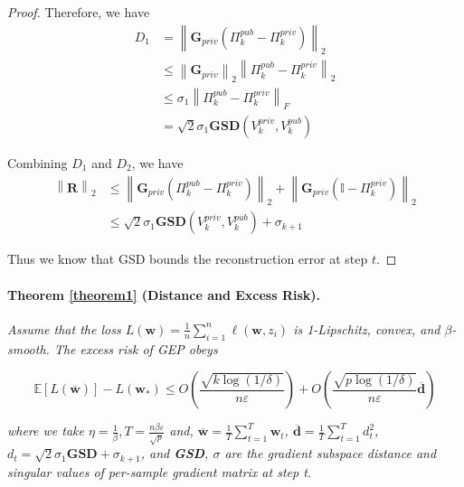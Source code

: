 \documentclass[11pt]{article}
\renewcommand{\epsilon}{\varepsilon}
\begin{document}
\begin{proof}
Therefore, we have
\begin{equation}
\begin{aligned}
    D_1 & = \left\| \mathbf{G}_{p r i v} (\Pi_k^{pub} - \Pi_k^{priv}) \right\|_2 \\
    & \le \left\| \mathbf{G}_{p r i v} \right\|_2 \left\| \Pi_k^{pub} - \Pi_k^{priv} \right\|_2 \\
    & \le \sigma_{1} \left\| \Pi_k^{pub} - \Pi_k^{priv} \right\|_F \\
    & = \sqrt{2}\sigma_{1} \mathbf{GSD}(V_k^{priv}, V_k^{p u b})
\end{aligned}
\end{equation}

Combining $D_1$ and $D_2$, we have
\begin{equation}
\begin{aligned}
\left\| \mathbf{R} \right\|_2 & \le \left\| \mathbf{G}_{p r i v} (\Pi_k^{pub} - \Pi_k^{priv}) \right\|_2 + \left\| \mathbf{G}_{p r i v}\left(\mathbb{I} - \Pi_k^{priv}\right)\right\|_2 \\
& \le \sqrt{2}\sigma_{1} \mathbf{GSD}(V_k^{priv}, V_k^{p u b}) + \sigma_{k + 1}
\end{aligned}
\end{equation}

Thus we know that GSD bounds the reconstruction error at step $t$.
\end{proof}

\paragraph{Theorem \ref{theorem1} (Distance and Excess Risk).} \textit{Assume that the loss $L(\mathbf{w}) = \frac{1}{n} \sum_{i=1}^n \ell\left(\mathbf{w}, z_i\right)$ is 1-Lipschitz, convex, and $\beta$-smooth. The excess risk of GEP \cite{donot} obeys}

\begin{equation}
    \mathbb{E}[L(\overline{\boldsymbol{\mathbf{w}}})]-L\left(\boldsymbol{\mathbf{w}}_*\right) \le O\left(\frac{\sqrt{k\log(1/\delta)}}{n\epsilon}\right) + O\left(\frac{\sqrt{p\log(1/\delta)}}{n\epsilon}\overline{\boldsymbol{\mathbf{d}}}\right)
\end{equation}

\textit{where we take $\eta=\frac{1}{\beta}, T=\frac{n \beta \epsilon}{\sqrt{p}}$ and, $\overline{\boldsymbol{\mathbf{w}}} = \frac{1}{T}\sum_{t=1}^{T}\mathbf{w}_t$, $\overline{\boldsymbol{\mathbf{d}}} = \frac{1}{T}\sum_{t=1}^{T}d^2_t$, $d_t = \sqrt{2}\sigma_{1}\mathbf{GSD} + \sigma_{k + 1}$, and \textbf{GSD}, $\sigma$ are the gradient subspace distance and singular values of per-sample gradient matrix at step t.}
\end{document}

